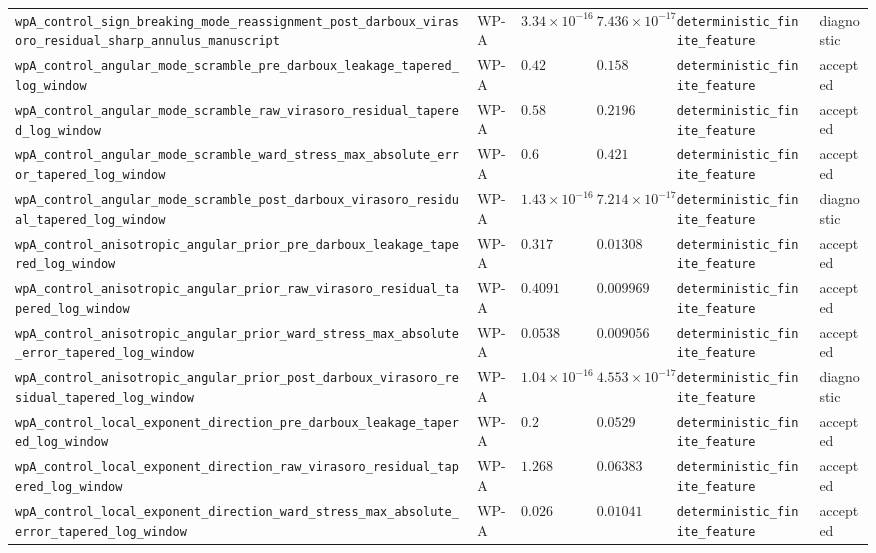 \begin{table}[t]
\begin{tabular}{@{}llllll@{}}
\texttt{wpA\_control\_sign\_breaking\_mode\_reassignment\_post\_darboux\_virasoro\_residual\_sharp\_annulus\_manuscript} & WP-A & $3.34\times10^{-16}$ & $7.436\times10^{-17}$ & \texttt{deterministic\_finite\_feature} & diagnostic \\
\texttt{wpA\_control\_angular\_mode\_scramble\_pre\_darboux\_leakage\_tapered\_log\_window} & WP-A & $0.42$ & $0.158$ & \texttt{deterministic\_finite\_feature} & accepted \\
\texttt{wpA\_control\_angular\_mode\_scramble\_raw\_virasoro\_residual\_tapered\_log\_window} & WP-A & $0.58$ & $0.2196$ & \texttt{deterministic\_finite\_feature} & accepted \\
\texttt{wpA\_control\_angular\_mode\_scramble\_ward\_stress\_max\_absolute\_error\_tapered\_log\_window} & WP-A & $0.6$ & $0.421$ & \texttt{deterministic\_finite\_feature} & accepted \\
\texttt{wpA\_control\_angular\_mode\_scramble\_post\_darboux\_virasoro\_residual\_tapered\_log\_window} & WP-A & $1.43\times10^{-16}$ & $7.214\times10^{-17}$ & \texttt{deterministic\_finite\_feature} & diagnostic \\
\texttt{wpA\_control\_anisotropic\_angular\_prior\_pre\_darboux\_leakage\_tapered\_log\_window} & WP-A & $0.317$ & $0.01308$ & \texttt{deterministic\_finite\_feature} & accepted \\
\texttt{wpA\_control\_anisotropic\_angular\_prior\_raw\_virasoro\_residual\_tapered\_log\_window} & WP-A & $0.4091$ & $0.009969$ & \texttt{deterministic\_finite\_feature} & accepted \\
\texttt{wpA\_control\_anisotropic\_angular\_prior\_ward\_stress\_max\_absolute\_error\_tapered\_log\_window} & WP-A & $0.0538$ & $0.009056$ & \texttt{deterministic\_finite\_feature} & accepted \\
\texttt{wpA\_control\_anisotropic\_angular\_prior\_post\_darboux\_virasoro\_residual\_tapered\_log\_window} & WP-A & $1.04\times10^{-16}$ & $4.553\times10^{-17}$ & \texttt{deterministic\_finite\_feature} & diagnostic \\
\texttt{wpA\_control\_local\_exponent\_direction\_pre\_darboux\_leakage\_tapered\_log\_window} & WP-A & $0.2$ & $0.0529$ & \texttt{deterministic\_finite\_feature} & accepted \\
\texttt{wpA\_control\_local\_exponent\_direction\_raw\_virasoro\_residual\_tapered\_log\_window} & WP-A & $1.268$ & $0.06383$ & \texttt{deterministic\_finite\_feature} & accepted \\
\texttt{wpA\_control\_local\_exponent\_direction\_ward\_stress\_max\_absolute\_error\_tapered\_log\_window} & WP-A & $0.026$ & $0.01041$ & \texttt{deterministic\_finite\_feature} & accepted \\

\end{tabular}
\end{table}
